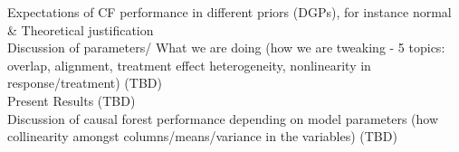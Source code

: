 \documentclass[12pt]{article}
\begin{document}
Expectations of CF performance in different priors (DGPs), for instance normal \& Theoretical justification \\

Discussion of parameters/ What we are doing (how we are tweaking - 5 topics: overlap, alignment, treatment effect heterogeneity, nonlinearity in response/treatment) (TBD)  \\

Present Results (TBD)\\

Discussion of causal forest performance depending on model parameters (how collinearity amongst columns/means/variance in the variables) (TBD) \\




\newpage


\end{document}
